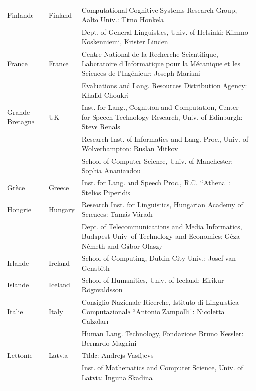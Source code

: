 \begin{longtable}{llp{105mm}}
  Finlande & \textcolor{grey1}{Finland} & Computational Cognitive Systems Research Group, Aalto Univ.: Timo Honkela\\ \addlinespace
  & & Dept. of General Linguistics, Univ. of Helsinki: Kimmo Koskenniemi, Krister Linden \\ \addlinespace
  France & \textcolor{grey1}{France} & Centre National de la Recherche Scientifique, Laboratoire d{\mbox '}Informatique pour la Mécanique et les Sciences de l{\mbox '}Ingénieur: Joseph Mariani \\ \addlinespace
  & & Evaluations and Lang. Resources Distribution Agency: Khalid Choukri\\ \addlinespace 
  Grande-Bretagne & \textcolor{grey1}{UK} & Inst. for Lang., Cognition and Computation, Center for Speech Technology Research, Univ. of Edinburgh: Steve Renals \\ \addlinespace 
  & & Research Inst. of Informatics and Lang. Proc., Univ. of Wolverhampton: Ruslan Mitkov \\ \addlinespace 
  & & School of Computer Science, Univ. of Manchester: Sophia Ananiandou \\ \addlinespace 
  Grèce & \textcolor{grey1}{Greece} & Inst. for Lang. and Speech Proc., R.C. ``Athena{\mbox '}{\mbox '}: Stelios Piperidis\\ \addlinespace
  Hongrie & \textcolor{grey1}{Hungary} & Research Inst. for Linguistics, Hungarian Academy of Sciences: Tamás Váradi\\  \addlinespace
  & & Dept. of Telecommunications and Media Informatics, Budapest Univ. of Technology and Economics: Géza Németh and Gábor Olaszy\\ \addlinespace
  Irlande & \textcolor{grey1}{Ireland} & School of Computing, Dublin City Univ.: Josef van Genabith\\ \addlinespace
  Islande & \textcolor{grey1}{Iceland} & School of Humanities, Univ. of Iceland: Eirikur Rögnvaldsson\\ \addlinespace
  Italie & \textcolor{grey1}{Italy} & Consiglio Nazionale Ricerche, Istituto di Linguistica Computazionale ``Antonio Zampolli{\mbox '}{\mbox '}: Nicoletta Calzolari\\ \addlinespace
  & & Human Lang. Technology, Fondazione Bruno Kessler: Bernardo Magnini\\ \addlinespace 
  Lettonie & \textcolor{grey1}{Latvia} & Tilde: Andrejs Vasiljevs\\ \addlinespace 
  & & Inst. of Mathematics and Computer Science, Univ. of Latvia: Inguna Skadina\\ \addlinespace

\end{longtable}
